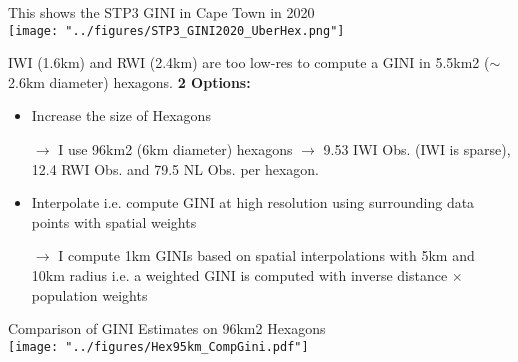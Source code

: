 \documentclass[compress,xcolor=dvipsnames]{beamer}
\begin{document}
\begin{frame}
This shows the STP3 GINI in Cape Town in 2020 \\ \vspace{1mm}
\texttt{[image: "../figures/STP3\_GINI2020\_UberHex.png"]}
\end{frame}

\begin{frame}
IWI (1.6km) and RWI (2.4km) are too low-res to compute a GINI in 5.5km2 ($\sim$ 2.6km diameter) hexagons. \textbf{2 Options:} \vspace{2mm}
\begin{itemize}
\item Increase the size of Hexagons
\item[$\to$] I use 96km2 (6km diameter) hexagons $\to$ 9.53 IWI Obs. (IWI is sparse), 12.4 RWI Obs. and 79.5 NL Obs. per hexagon.
\item Interpolate i.e. compute GINI at high resolution using surrounding data points with spatial weights
\item[$\to$] I compute 1km GINIs based on spatial interpolations with 5km and 10km radius i.e. a weighted GINI is computed with inverse distance $\times$ population weights
\end{itemize} 
\end{frame}

\begin{frame}
Comparison of GINI Estimates on 96km2 Hexagons \\ \vspace{1mm}
\texttt{[image: "../figures/Hex95km\_CompGini.pdf"]}
\begin{table}[ht] \vspace{-5mm}
\centering
\caption{Population Weighted GINI's in 96km2 Hexagons}
\vspace{-4mm}
\end{table}
\end{frame}
\end{document}
